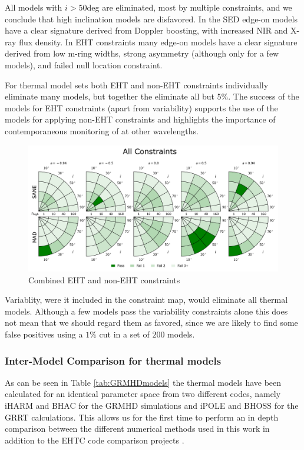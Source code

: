 All models with $i > 50$deg are eliminated, most by multiple constraints, and we conclude that high inclination models are disfavored.  In the SED edge-on models have a clear signature derived from Doppler boosting, with increased NIR and X-ray flux density.  In EHT constraints many edge-on models have a clear signature derived from low m-ring widths, strong asymmetry (although only for a few models), and failed null location constraint.

For thermal model sets both EHT and non-EHT constraints individually eliminate many models, but together the eliminate all but 5\%.  The success of the models for EHT constraints (apart from variability) supports the use of the models for applying non-EHT constraints and highlights the importance of contemporaneous monitoring of \sgra at other wavelengths.

\begin{figure}
  \centering
  \includegraphics[width=\columnwidth]{./figures/All_Constraints.png}
  \caption{Combined EHT and non-EHT constraints}
  \label{fig:all_cuts}
\end{figure}

Variablity, were it included in the constraint map, would eliminate all thermal models.  Although a few models pass the variability constraints alone this does not mean that we should regard them as favored, since we are likely to find some false positives using a $1\%$ cut in a set of $200$ models.

\subsubsection{Inter-Model Comparison for thermal models}

As can be seen in Table \ref{tab:GRMHDmodels} the thermal models have been calculated for an identical parameter space from two different codes, namely iHARM and BHAC for the GRMHD simulations and iPOLE and BHOSS for the GRRT calculations. This allows us for the first time to perform an in depth comparison between the different numerical methods used in this work in addition to the EHTC code comparison projects \citep{2019ApJS..243...26P,2020ApJ...897..148G}.

